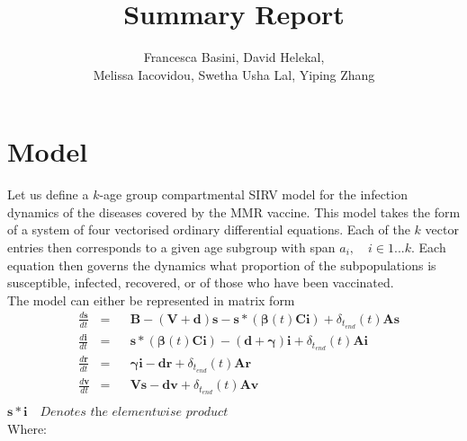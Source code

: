 \documentclass{article}
\title{Summary Report}
\author{Francesca Basini, David Helekal,\\Melissa Iacovidou, Swetha Usha Lal, Yiping Zhang}
\theoremstyle{definition}
\begin{document}
\maketitle
\newpage
\section{Model}

Let us define a $k$-age group compartmental SIRV model for the infection dynamics of the diseases covered by the MMR vaccine. This model takes the form of a system of four vectorised ordinary differential equations. Each of the $k$ vector entries then corresponds to a given age subgroup with span $a_i, \quad i\in1...k$. Each equation then governs the dynamics what proportion of the subpopulations is susceptible, infected, recovered, or of those who have been vaccinated.\\
The model can either be represented in matrix form
\begin{align*}
&\frac{d\mathbf{s}}{dt} &=&& \mathbf{B} - (\mathbf{V} + \mathbf{d})\mathbf{s} - \mathbf{s}*(\pmb{\beta}(t)\mathbf{C}\mathbf
{i})+\delta_{t_{end}}(t)\mathbf{A}\mathbf{s}\\
&\frac{d\mathbf{i}}{dt} &=&&\mathbf{s}*(\pmb{\beta}(t)\mathbf{C}\mathbf{i}) - (\mathbf{d} + \pmb{\gamma})\mathbf{i}+\delta_{t_{end}}(t)\mathbf{A}\mathbf{i}\\
&\frac{d\mathbf{r}}{dt} &=&& \pmb{\gamma}\mathbf{i} - \mathbf{d}\mathbf{r}+\delta_{t_{end}}(t)\mathbf{A}\mathbf{r}\\
&\frac{d\mathbf{v}}{dt} &=&& \mathbf{V}\mathbf{s}-\mathbf{d}\mathbf{v} +\delta_{t_{end}}(t)\mathbf{A}\mathbf{v}\\
\end{align*}
$\mathbf{s}*\mathbf{i}\quad\textit{Denotes the elementwise product}$\\
Where:
\end{document}
